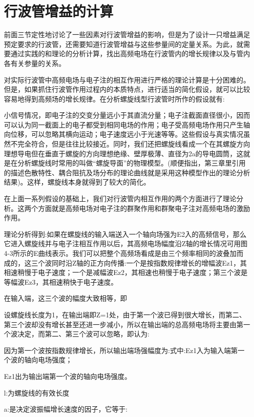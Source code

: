  
\section{行波管增益的计算} 


前面三节定性地讨论了一些因素对行波管增益的影响，但是为了设计一只增益满足预定要求的行波管，还需要知道行波管增益与这些参量间的定量关系。为此，就需要通过实践的和理论的分析计算，找出高频电场在行波管内的增长规律以及与管内各有关参量的关系。


对实际行波管中高频电场与电子注的相互作用进行严格的理论计算是十分困难的。但是，如果抓住行波管作用过程内的本质特点，进行适当的简化假设，就可以比较容易地得到高频场的增长规律。在分析螺旋线型行波管时所作的假设就有:


小信号情况，即电子注的交变分量远小于其直流分量；电子注截面直径很小，因而可以认为同一截面上的电子都受到相同电场的作用；电子受高频电场作用只产生轴向位移，可以忽略其横向运动；电子速度远小于光速等等。这些假设与真实情况虽然不完全符合，但是往往比较接近。同时，我们还把螺旋线看成一个在其螺旋方向理想导电但在垂直于螺旋的方向理想绝缘、壁厚极薄、直径为2a的导电圆筒，这就是在分析螺旋线时常用的叫做“螺旋导面”的物理模型。(顺便指出，第三章里引用的描述色散特性、耦合阻抗及场分布的理论曲线就是采用这种模型作出的理论分析结果)。这样，螺旋线本身就得到了较大的简化。


在上面一系列假设的基础上，我们对行波管内相互作用的两个方面进行了理论分析。这两个方面就是高频电场对电子注的群聚作用和群聚电子注对高频电场的激励作用。


理论分析得到:如果在螺旋线的输入端送入一个轴向场强为E2入的高频信号，那么它进入螺旋线并与电子注相互作用以后，其高频电场幅度沿Z轴的增长情况可用图4-3所示的E曲线表示。我们可以把整个高频场看成是由三个频率相同的波叠加而成的，这三个波同时沿Z轴的正方向传播:一个是按指数规律增长的增幅波Ez1，其相速稍慢于电子速度；一个是减幅波Ez2，其相速也稍慢于电子速度；第三个波是等幅波Ez3，其相速稍快于电子速度。


在输入端，这三个波的幅度大致相等，即


设螺旋线长度为1，在输出端即Z=1处，由于第一个波已得到很大增长，而第二、第三个波却没有增长甚至还进一步减小，所以在输出端的总高频电场将主要由第一个波决定，而第二、第三个波可以忽略，即认为:


因为第一个波按指数规律增长，所以输出端场强幅度为:式中:Ez1入为输入端第一个波的轴向电场强度；


Ez1出为输出端第一个波的轴向电场强度。


l:为螺旋线的有效长度


a:是决定波振幅增长速度的因子，它等于:


